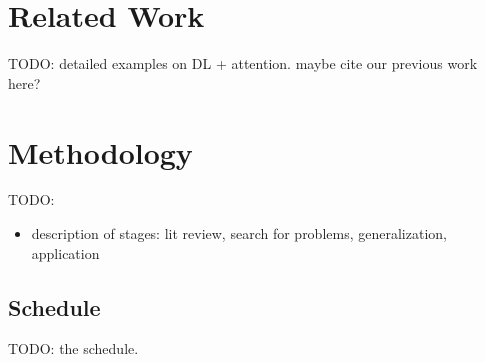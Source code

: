 \documentclass[English]{style/ic-tese-v3}
\begin{document}
\let\clearpage\relax

\chapter{Related Work}
TODO: detailed examples on DL + attention.
maybe cite our previous work here?

\let\clearpage\relax

\chapter{Methodology}
TODO:
\begin{itemize}
    \item description of stages: lit review,
        search for problems, generalization, application
\end{itemize}

\section{Schedule}
TODO: the schedule.

\renewcommand\bibname{References\vspace*{10mm}}

\begingroup
\let\clearpage\relax


\endgroup
\end{document}
